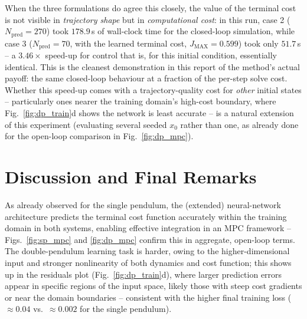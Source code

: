 \documentclass[11pt,a4paper]{article}
\begin{document}
When the three formulations do agree this closely, the value of the terminal cost is not
visible in \emph{trajectory shape} but in \emph{computational cost}: in this run, case 2
($N_{\text{pred}}=270$) took $178.9\,$s of wall-clock time for the closed-loop simulation, while
case 3 ($N_{\text{pred}}=70$, with the learned terminal cost, $J_{\text{MAX}}=0.599$) took only
$51.7\,$s -- a $3.46\times$ speed-up for control that is, for this initial condition, essentially
identical. This is the cleanest demonstration in this report of the method's actual payoff:
the same closed-loop behaviour at a fraction of the per-step solve cost. Whether this speed-up
comes with a trajectory-quality cost for \emph{other} initial states -- particularly ones nearer
the training domain's high-cost boundary, where Fig.~\ref{fig:dp_train}d shows the network is
least accurate -- is a natural extension of this experiment (evaluating several seeded $x_0$
rather than one, as already done for the open-loop comparison in Fig.~\ref{fig:dp_mpc}).

\section{Discussion and Final Remarks}

As already observed for the single pendulum, the (extended) neural-network architecture predicts
the terminal cost function accurately within the training domain in both systems, enabling
effective integration in an MPC framework -- Figs.~\ref{fig:sp_mpc} and \ref{fig:dp_mpc} confirm
this in aggregate, open-loop terms. The double-pendulum learning task is harder, owing to the
higher-dimensional input and stronger nonlinearity of both dynamics and cost function; this shows
up in the residuals plot (Fig.~\ref{fig:dp_train}d), where larger prediction errors appear in
specific regions of the input space, likely those with steep cost gradients or near the domain
boundaries -- consistent with the higher final training loss ($\approx 0.04$ vs.\ $\approx 0.002$
for the single pendulum).
\end{document}
